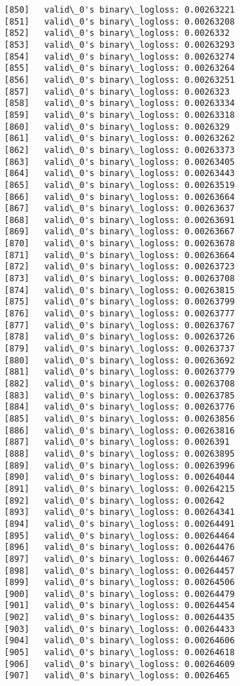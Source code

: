 \documentclass[11pt]{article}
\begin{document}
\begin{Verbatim}[commandchars=\\\{\}]
[850]	valid\_0's binary\_logloss: 0.00263221
[851]	valid\_0's binary\_logloss: 0.00263208
[852]	valid\_0's binary\_logloss: 0.0026332
[853]	valid\_0's binary\_logloss: 0.00263293
[854]	valid\_0's binary\_logloss: 0.00263274
[855]	valid\_0's binary\_logloss: 0.00263264
[856]	valid\_0's binary\_logloss: 0.00263251
[857]	valid\_0's binary\_logloss: 0.0026323
[858]	valid\_0's binary\_logloss: 0.00263334
[859]	valid\_0's binary\_logloss: 0.00263318
[860]	valid\_0's binary\_logloss: 0.0026329
[861]	valid\_0's binary\_logloss: 0.00263262
[862]	valid\_0's binary\_logloss: 0.00263373
[863]	valid\_0's binary\_logloss: 0.00263405
[864]	valid\_0's binary\_logloss: 0.00263443
[865]	valid\_0's binary\_logloss: 0.00263519
[866]	valid\_0's binary\_logloss: 0.00263664
[867]	valid\_0's binary\_logloss: 0.00263637
[868]	valid\_0's binary\_logloss: 0.00263691
[869]	valid\_0's binary\_logloss: 0.00263667
[870]	valid\_0's binary\_logloss: 0.00263678
[871]	valid\_0's binary\_logloss: 0.00263664
[872]	valid\_0's binary\_logloss: 0.00263723
[873]	valid\_0's binary\_logloss: 0.00263708
[874]	valid\_0's binary\_logloss: 0.00263815
[875]	valid\_0's binary\_logloss: 0.00263799
[876]	valid\_0's binary\_logloss: 0.00263777
[877]	valid\_0's binary\_logloss: 0.00263767
[878]	valid\_0's binary\_logloss: 0.00263726
[879]	valid\_0's binary\_logloss: 0.00263737
[880]	valid\_0's binary\_logloss: 0.00263692
[881]	valid\_0's binary\_logloss: 0.00263779
[882]	valid\_0's binary\_logloss: 0.00263708
[883]	valid\_0's binary\_logloss: 0.00263785
[884]	valid\_0's binary\_logloss: 0.00263776
[885]	valid\_0's binary\_logloss: 0.00263856
[886]	valid\_0's binary\_logloss: 0.00263816
[887]	valid\_0's binary\_logloss: 0.0026391
[888]	valid\_0's binary\_logloss: 0.00263895
[889]	valid\_0's binary\_logloss: 0.00263996
[890]	valid\_0's binary\_logloss: 0.00264044
[891]	valid\_0's binary\_logloss: 0.00264215
[892]	valid\_0's binary\_logloss: 0.002642
[893]	valid\_0's binary\_logloss: 0.00264341
[894]	valid\_0's binary\_logloss: 0.00264491
[895]	valid\_0's binary\_logloss: 0.00264464
[896]	valid\_0's binary\_logloss: 0.00264476
[897]	valid\_0's binary\_logloss: 0.00264467
[898]	valid\_0's binary\_logloss: 0.00264457
[899]	valid\_0's binary\_logloss: 0.00264506
[900]	valid\_0's binary\_logloss: 0.00264479
[901]	valid\_0's binary\_logloss: 0.00264454
[902]	valid\_0's binary\_logloss: 0.00264435
[903]	valid\_0's binary\_logloss: 0.00264433
[904]	valid\_0's binary\_logloss: 0.00264606
[905]	valid\_0's binary\_logloss: 0.00264618
[906]	valid\_0's binary\_logloss: 0.00264609
[907]	valid\_0's binary\_logloss: 0.0026465

\end{Verbatim}
\end{document}
